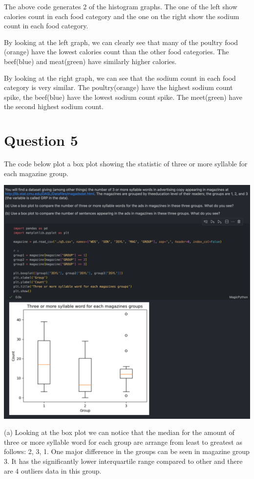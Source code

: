 \documentclass{report}
\begin{document}
    The above code generates 2 of the histogram graphs. The one of the left show calories count in each food category and the one on the right show the sodium count in each food category. 
    

    \null By looking at the left graph, we can clearly see that many of the poultry food (orange) have the lowest calories count than the other food categories. The beef(blue) and meat(green) have similarly higher calories.

    By looking at the right graph, we can see that the sodium count in each food category is very similar. The poultry(orange) have the highest sodium count spike, the beef(blue) have the lowest sodium count spike. The meet(green) have the second highest sodium count.

\newpage

\section*{Question 5}

    The code below plot a box plot showing the statistic of three or more syllable for each magazine group.

    \includegraphics[scale=0.35]{q5a.png} 

    
    (a) Looking at the box plot we can notice that the median for the amount of three or more syllable word for each group are arrange from least to greatest as follows: 2, 3, 1.
    One major difference in the groups can be seen in magazine group 3. It has the significantly lower interquartile range compared to other and there are 4 outliers data in this group.
\end{document}
